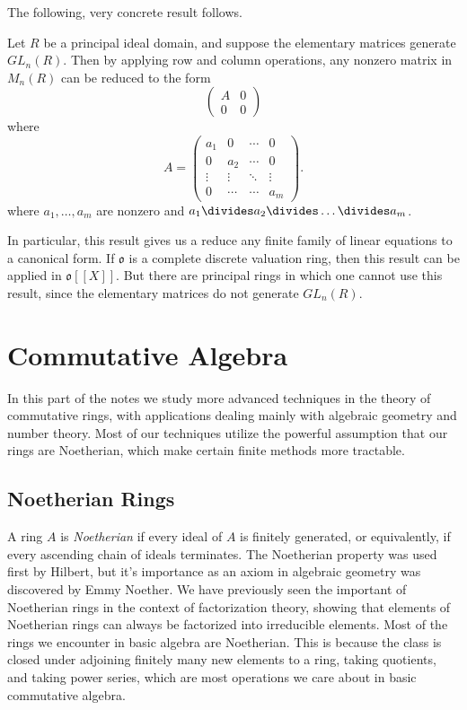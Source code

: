 The following, very concrete result follows.

\begin{theorem}
    Let $R$ be a principal ideal domain, and suppose the elementary matrices generate $GL_n(R)$. Then by applying row and column operations, any nonzero matrix in $M_n(R)$ can be reduced to the form
    \[ \begin{pmatrix}
            A & 0 \\ 0 & 0
    \end{pmatrix} \]
    where
    \[ A = \begin{pmatrix} a_1 & 0 & \cdots & 0 \\ 0 & a_2 & \cdots & 0 \\ \vdots & \vdots & \ddots & \vdots \\ 0 & \cdots & \cdots & a_m \end{pmatrix}. \]
    where $a_1,\dots,a_m$ are nonzero and $a_1 \divides a_2 \divides \dots \divides a_m$.
\end{theorem}

In particular, this result gives us a reduce any finite family of linear equations to a canonical form. If $\mathfrak{o}$ is a complete discrete valuation ring, then this result can be applied in $\mathfrak{o}[[X]]$. But there are principal rings in which one cannot use this result, since the elementary matrices do not generate $GL_n(R)$.




\part{Commutative Algebra}

In this part of the notes we study more advanced techniques in the theory of commutative rings, with applications dealing mainly with algebraic geometry and number theory. Most of our techniques utilize the powerful assumption that our rings are Noetherian, which make certain finite methods more tractable.

\chapter{Noetherian Rings}

A ring $A$ is \emph{Noetherian} if every ideal of $A$ is finitely generated, or equivalently, if every ascending chain of ideals terminates. The Noetherian property was used first by Hilbert, but it's importance as an axiom in algebraic geometry was discovered by Emmy Noether. We have previously seen the important of Noetherian rings in the context of factorization theory, showing that elements of Noetherian rings can always be factorized into irreducible elements. Most of the rings we encounter in basic algebra are Noetherian. This is because the class is closed under adjoining finitely many new elements to a ring, taking quotients, and taking power series, which are most operations we care about in basic commutative algebra.

